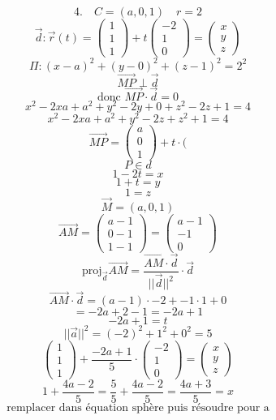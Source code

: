 \documentclass{article}
\begin{document}
\[ 4. \quad C=(a,0,1) \quad r=2 \]
\[ \vec{d}:\vec{r}(t) = \begin{pmatrix} 1 \\ 1 \\ 1 \end{pmatrix} + t \begin{pmatrix} -2 \\ 1 \\ 0 \end{pmatrix} = \begin{pmatrix} x \\ y \\ z \end{pmatrix} \]
\[ \Pi: (x-a)^2 + (y-0)^2 + (z-1)^2 = 2^2 \]
\[ \vec{MP} \perp \vec{d} \]
\[ \text{donc } \vec{MP} \cdot \vec{d} = 0 \]
\[ x^2 - 2xa + a^2 + y^2 - 2y + 0 + z^2 - 2z + 1 = 4 \]
\[ x^2 - 2xa + a^2 + y^2 - 2z + z^2 + 1 = 4 \]
\[ \vec{MP} = \begin{pmatrix} a \\ 0 \\ 1 \end{pmatrix} + t \cdot ( \]
\[ P \in d \]
\[ 1-2t = x \]
\[ 1+t = y \]
\[ 1 = z \]
\[ \vec{M} = (a,0,1) \]
\[ \vec{AM} = \begin{pmatrix} a-1 \\ 0-1 \\ 1-1 \end{pmatrix} = \begin{pmatrix} a-1 \\ -1 \\ 0 \end{pmatrix} \]
\[ \text{proj}_{\vec{d}} \vec{AM} = \frac{\vec{AM} \cdot \vec{d}}{||\vec{d}||^2} \cdot \vec{d} \]
\[ \vec{AM} \cdot \vec{d} = (a-1) \cdot -2 + -1 \cdot 1 + 0 \]
\[ = -2a + 2 - 1 = -2a + 1 \]
\[ -2a+1 = t \]
\[ ||\vec{a}||^2 = (-2)^2 + 1^2 + 0^2 = 5 \]
\[ \begin{pmatrix} 1 \\ 1 \\ 1 \end{pmatrix} + \frac{-2a+1}{5} \cdot \begin{pmatrix} -2 \\ 1 \\ 0 \end{pmatrix} = \begin{pmatrix} x \\ y \\ z \end{pmatrix} \]
\[ 1 + \frac{4a-2}{5} = \frac{5}{5} + \frac{4a-2}{5} = \frac{4a+3}{5} = x \]
\[ \text{remplacer dans équation sphère puis résoudre pour a} \]
\end{document}
